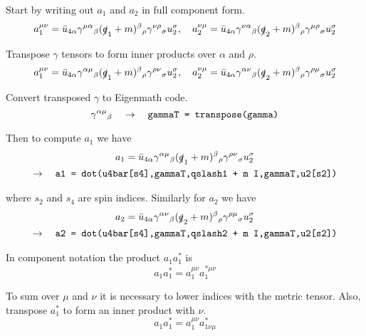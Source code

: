\documentclass[12pt]{article}
\begin{document}
\bigskip
Start by writing out $a_1$ and $a_2$ in full component form.
\begin{equation*}
a_1^{\mu\nu}
=\bar{u}_{4\alpha}\gamma^{\mu\alpha}{}_\beta(\slashed{q}_1+m)^\beta{}_\rho\gamma^{\nu\rho}{}_\sigma u_2^\sigma,
\quad
a_2^{\nu\mu}
=\bar{u}_{4\alpha}\gamma^{\nu\alpha}{}_\beta(\slashed{q}_2+m)^\beta{}_\rho\gamma^{\mu\rho}{}_\sigma u_2^\sigma
\end{equation*}

Transpose $\gamma$ tensors to form inner products over $\alpha$ and $\rho$.
\begin{equation*}
a_1^{\mu\nu}
=\bar{u}_{4\alpha}\gamma^{\alpha\mu}{}_\beta(\slashed{q}_1+m)^\beta{}_\rho\gamma^{\rho\nu}{}_\sigma u_2^\sigma,
\quad
a_2^{\nu\mu}
=\bar{u}_{4\alpha}\gamma^{\alpha\nu}{}_\beta(\slashed{q}_2+m)^\beta{}_\rho\gamma^{\rho\mu}{}_\sigma u_2^\sigma
\end{equation*}

Convert transposed $\gamma$ to Eigenmath code.
\begin{equation*}
\gamma^{\alpha\mu}{}_\beta
\quad\rightarrow\quad
\text{\tt gammaT = transpose(gamma)}
\end{equation*}

Then to compute $a_1$ we have
\begin{multline*}
a_1=\bar{u}_{4\alpha}\gamma^{\alpha\mu}{}_\beta(\slashed{q}_1+m)^\beta{}_\rho\gamma^{\rho\nu}{}_\sigma u_2^\sigma
\\
\rightarrow\quad
\text{\tt a1 = dot(u4bar[s4],gammaT,qslash1 + m I,gammaT,u2[s2])}
\end{multline*}

where $s_2$ and $s_4$ are spin indices.
Similarly for $a_2$ we have
\begin{multline*}
a_2=\bar{u}_{4\alpha}\gamma^{\alpha\nu}{}_\beta(\slashed{q}_2+m)^\beta{}_\rho\gamma^{\rho\mu}{}_\sigma u_2^\sigma
\\
\rightarrow\quad
\text{\tt a2 = dot(u4bar[s4],gammaT,qslash2 + m I,gammaT,u2[s2])}
\end{multline*}

In component notation the product $a_1a_1^*$ is
\begin{equation*}
a_1a_1^*=a_1^{\mu\nu}a_1^{*\mu\nu}
\end{equation*}

To sum over $\mu$ and $\nu$ it is necessary to lower indices with the metric tensor.
Also, transpose $a_1^*$ to form an inner product with $\nu$.
\begin{equation*}
a_1a_1^*=a_1^{\mu\nu}a_{1\nu\mu}^*
\end{equation*}
\end{document}
